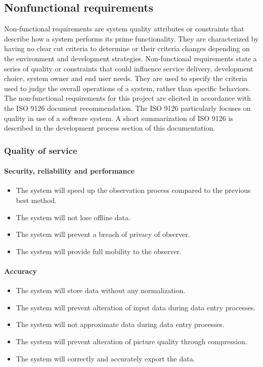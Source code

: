 \newpage
\subsection{Nonfunctional requirements}
Non-functional requirements are system quality attributes or constraints that describe how a system performs its prime functionality.
They are characterized by having no clear cut criteria to determine or their criteria
changes depending on the environment and development strategies\cite{req:requirements-technique2}.
Non-functional requirements state a series of quality or constraints that could influence service delivery,
development choice, system owner and end user needs.
They are used to specify the criteria used to judge the overall operations of a system,
rather than specific behaviors.
The non-functional requirements for this project are elicited in accordance with the ISO 9126 document recommendation.
The ISO 9126 particularly focuses on quality in use of a software system.
A short summarization of ISO 9126 is described in the development process section of this documentation.
\\[0.4cm]

\subsubsection{Quality of service}
    \paragraph{Security, reliability and performance}
	\begin{itemize}
        \item The system will speed up the observation process compared to the previous best method.
        \item The system will not lose offline data.
        \item The system will prevent a breach of privacy of observer.
        \item The system will provide full mobility to the observer.

	\end{itemize}
    \paragraph{Accuracy}
        \begin{itemize}
            \item The system will store data without any normalization.
            \item The system will prevent alteration of input data during data entry processes.
            \item The system will not approximate data during data entry processes.
            \item The system will prevent alteration of picture quality through compression.
            \item The system will correctly and accurately export the data.

        \end{itemize}
